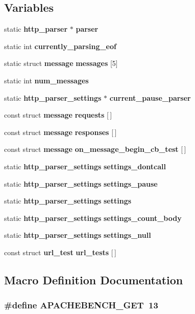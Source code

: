 \subsection*{Variables}
\begin{DoxyCompactItemize}
\item 
static {\bf http\+\_\+parser} $\ast$ {\bf parser}
\item 
static int {\bf currently\+\_\+parsing\+\_\+eof}
\item 
static struct {\bf message} {\bf messages} [5]
\item 
static int {\bf num\+\_\+messages}
\item 
static {\bf http\+\_\+parser\+\_\+settings} $\ast$ {\bf current\+\_\+pause\+\_\+parser}
\item 
const struct {\bf message} {\bf requests} [$\,$]
\item 
const struct {\bf message} {\bf responses} [$\,$]
\item 
const struct {\bf message} {\bf on\+\_\+message\+\_\+begin\+\_\+cb\+\_\+test} [$\,$]
\item 
static {\bf http\+\_\+parser\+\_\+settings} {\bf settings\+\_\+dontcall}
\item 
static {\bf http\+\_\+parser\+\_\+settings} {\bf settings\+\_\+pause}
\item 
static {\bf http\+\_\+parser\+\_\+settings} {\bf settings}
\item 
static {\bf http\+\_\+parser\+\_\+settings} {\bf settings\+\_\+count\+\_\+body}
\item 
static {\bf http\+\_\+parser\+\_\+settings} {\bf settings\+\_\+null}
\item 
const struct {\bf url\+\_\+test} {\bf url\+\_\+tests} [$\,$]
\end{DoxyCompactItemize}


\subsection{Macro Definition Documentation}
\subsubsection[{A\+P\+A\+C\+H\+E\+B\+E\+N\+C\+H\+\_\+\+G\+ET}]{\setlength{\rightskip}{0pt plus 5cm}\#define A\+P\+A\+C\+H\+E\+B\+E\+N\+C\+H\+\_\+\+G\+ET~13}\label{test_8c_a1342fa8973972db3903f2421b1d39b35}
